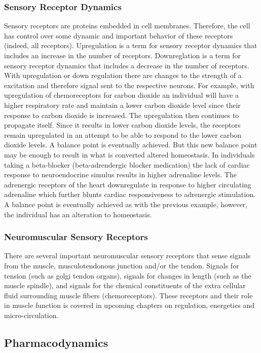 \subsubsection{Sensory Receptor Dynamics}
Sensory receptors are proteins embedded in cell membranes. Therefore, the cell has control over some dynamic and important behavior of these receptors (indeed, all receptors).  Upregulation is a term for sensory receptor dynamics that includes an increase in the number of receptors. Downreglation is a term for sensory receptor dynamics that includes a decrease in the number of receptors. With upregulation or down regulation there are changes to the strength of a excitation and therefore signal sent to the respective neurons. For example, with upregulation of chemoreceptors for carbon dioxide an individual will have a higher respiratory rate and maintain a lower carbon dioxide level since their response to carbon dioxide is increased. The upregulation then continues to propagate itself. Since it results in lower carbon dioxide levels, the receptors remain upregulated in an attempt to be able to respond to the lower carbon dioxide levels. A balance point is eventually achieved. But this new balance point may be enough to result in what is converted altered homeostasis. In individuals taking a beta-blocker (beta-adrendergic blocker medication) the lack of cardiac response to neuroendocrine simulus results in higher adrenaline levels. The adrenergic receptors of the heart downregulate in response to higher circulating adrenaline which further blunts cardiac responsiveness to adrenergic stimulation. A balance point is eventually achieved as with the previous example, however, the individual has an alteration to homeostasis. 

\subsubsection{Neuromuscular Sensory Receptors} 
There are several important neuromuscular sensory receptors that sense signals from the muscle, musculotendonous junction and/or the tendon. Signals for tension (such as golgi tendon organs), signals for changes in length (such as the muscle spindle), and signals for the chemical constituents of the extra cellular fluid surrounding muscle fibers (chemoreceptors). These receptors and their role in muscle function is covered in upcoming chapters on regulation, energetics and micro-circulation.

\subsection{Pharmacodynamics}

